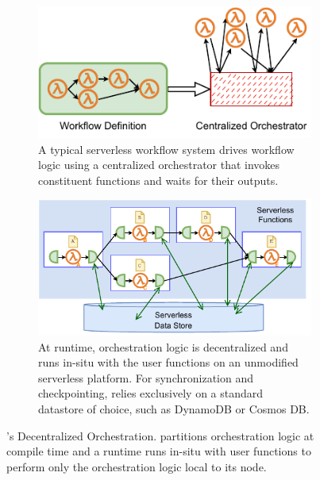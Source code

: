 \begin{figure}[t!]
\begin{subfigure}[t]{0.8\textwidth}
	\end{subfigure}
	\begin{subfigure}[b]{\columnwidth}
		\centering
		\includegraphics[width=0.8\columnwidth]{figures/unum-arch-centralized.pdf}
		\caption{A typical serverless workflow system drives workflow logic
			using a centralized orchestrator that invokes constituent
			functions and waits for their outputs.}
		\label{fig:arch:centralized}
	\end{subfigure}
	\hfill
	\begin{subfigure}[b]{\columnwidth}
		\centering
		\includegraphics[width=.7\columnwidth]{figures/unum-arch-runtime.pdf}
		\caption{At runtime, \name{} orchestration logic is decentralized and
			runs in-situ with the user functions on an unmodified serverless
			platform. For synchronization and checkpointing,
			\name{} relies exclusively on a standard datastore of choice, such
			as DynamoDB or Cosmos DB.}
		\label{fig:arch:unum-runtime}
	\end{subfigure}
	\caption{\name{}'s Decentralized Orchestration. \name{} partitions
	orchestration logic at compile time and a \name{} runtime runs in-situ
	with user functions to perform only the orchestration logic local to its
	node.}
	\label{fig:arch}
\end{figure}

